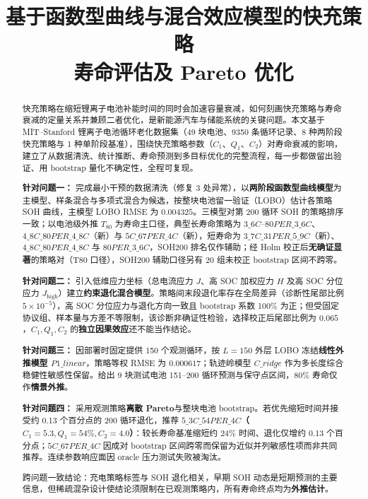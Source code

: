 \documentclass[withoutpreface,bwprint]{cumcmthesis}
\title{基于函数型曲线与混合效应模型的快充策略\\寿命评估及 Pareto 优化}
\begin{document}
\maketitle

\begin{abstract}
快充策略在缩短锂离子电池补能时间的同时会加速容量衰减，如何刻画快充策略与寿命衰减的定量关系并兼顾二者优化，是新能源汽车与储能系统的关键问题。本文基于 MIT--Stanford 锂离子电池循环老化数据集（49 块电池、9350 条循环记录、8 种两阶段快充策略与 1 种单阶段基准），围绕快充策略参数（$C_1$、$Q_1$、$C_2$）对寿命衰减的影响，建立了从数据清洗、统计推断、寿命预测到多目标优化的完整流程，每一步都做留出验证、用 bootstrap 量化不确定性，全程可复现。

\textbf{针对问题一：} 完成最小干预的数据清洗（修复 3 处异常），以\textbf{两阶段函数型曲线模型}为主模型、样条混合与多项式混合为候选，按整块电池留一验证（LOBO）估计各策略 SOH 曲线，主模型 LOBO RMSE 为 $0.004325$。三模型对第 200 循环 SOH 的策略排序一致；以电池级外推 $T_{80}$ 为寿命主口径，典型长寿命策略为 $3\_6C$--$80PER\_3\_6C$、$4\_8C\_80PER\_4\_8C$（新）与 $5C\_67PER\_4C$（新），短寿命为 $3\_7C\_31PER\_5\_9C$（新）、$4\_8C\_80PER\_4\_8C$ 与 $80PER\_3\_6C$，SOH200 排名仅作辅助；经 Holm 校正后\textbf{无确证显著}的策略对（T80 口径），SOH200 辅助口径另有 20 组未校正 bootstrap 区间不跨零。

\textbf{针对问题二：} 引入低维应力坐标（总电流应力 $J$、高 SOC 加权应力 $H$ 及高 SOC 分位应力 $J_{\mathrm{high}}$）建立\textbf{约束退化混合模型}。策略间末段退化率存在全局差异（诊断性尾部比例 $5\times10^{-5}$），高 SOC 分位应力与退化方向一致且 bootstrap 系数 100\% 为正；但受固定协议组、样本量与方差不等限制，该诊断非确证性检验，选择校正后尾部比例为 $0.065$，$C_1,Q_1,C_2$ 的\textbf{独立因果效应}还不能当作结论。

\textbf{针对问题三：} 因部署时固定提供 150 个观测循环，按 $L=150$ 外层 LOBO 冻结\textbf{线性外推模型 $P1\_linear$}，策略等权 RMSE 为 $0.000617$；轨迹岭模型 $C\_ridge$ 作为多长度综合稳健性敏感性保留。给出 9 块测试电池 151--200 循环预测与保守点区间，80\% 寿命仅作\textbf{情景外推}。

\textbf{针对问题四：} 采用观测策略\textbf{离散 Pareto}与整块电池 bootstrap。若优先缩短时间并接受约 0.13 个百分点的 200 循环退化，推荐 \textbf{$5\_3C\_54PER\_4C$（$C_1=5.3,Q_1=54\%,C_2=4.0$）}：较长寿命基准缩短约 24\% 时间、退化仅增约 0.13 个百分点；$5C\_67PER\_4C$ 因成对 bootstrap 区间跨零而保留为近似并列敏感性项而非共同推荐。连续参数响应面因 oracle 压力测试失败被淘汰。

跨问题一致结论：充电策略标签与 SOH 退化相关，早期 SOH 动态是短期预测的主要信息，但稀疏混杂设计使结论须限制在已观测策略内，所有寿命终点均为\textbf{外推估计}。

\end{abstract}
\end{document}
